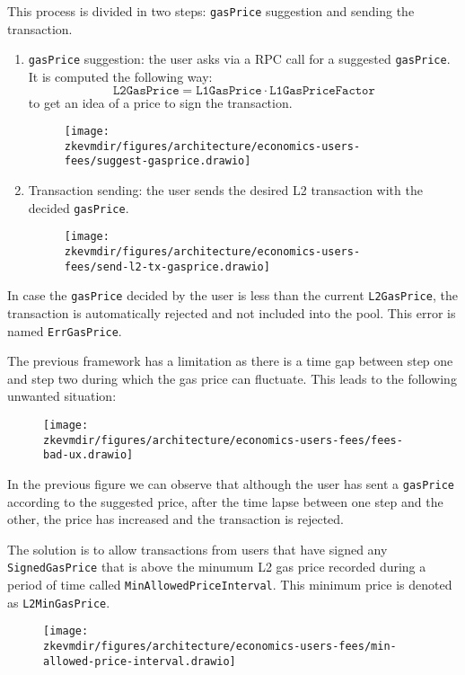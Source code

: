 This process is divided in two steps: \texttt{gasPrice} suggestion and sending the transaction.

\begin{enumerate}
\item \texttt{gasPrice} suggestion: the user asks via a RPC call for a suggested \texttt{gasPrice}. It is computed the following way:
\[
\texttt{L2GasPrice} = \texttt{L1GasPrice} \cdot \texttt{L1GasPriceFactor}
\]
to get an idea of a price to sign the transaction.
\begin{figure}[H]
\centering
\texttt{[image: \\zkevmdir/figures/architecture/economics-users-fees/suggest-gasprice.drawio]}
\end{figure}
\item Transaction sending: the user sends the desired L2 transaction with the decided \texttt{gasPrice}.
\begin{figure}[H]
\centering
\texttt{[image: \\zkevmdir/figures/architecture/economics-users-fees/send-l2-tx-gasprice.drawio]}
\end{figure}
\end{enumerate}

In case the \texttt{gasPrice} decided by the user is less than the current \texttt{L2GasPrice}, the transaction is automatically rejected and not included into the pool. This error is named \texttt{ErrGasPrice}.

The previous framework has a limitation as there is a time gap between step one and step two during which the gas price can fluctuate. This leads to the following unwanted situation:
\begin{figure}[H]
\centering
\texttt{[image: \\zkevmdir/figures/architecture/economics-users-fees/fees-bad-ux.drawio]}
\end{figure}

In the previous figure we can observe that although the user has sent a \texttt{gasPrice} according to the suggested price, after the time lapse between one step and the other, the price has increased and the transaction is rejected.


The solution is to allow transactions from users that have signed any \texttt{SignedGasPrice} that is above the minumum L2 gas price recorded during a period of time called \texttt{MinAllowedPriceInterval}. This minimum price is denoted as \texttt{L2MinGasPrice}.

\begin{figure}[H]
\centering
\texttt{[image: \\zkevmdir/figures/architecture/economics-users-fees/min-allowed-price-interval.drawio]}
\end{figure}


